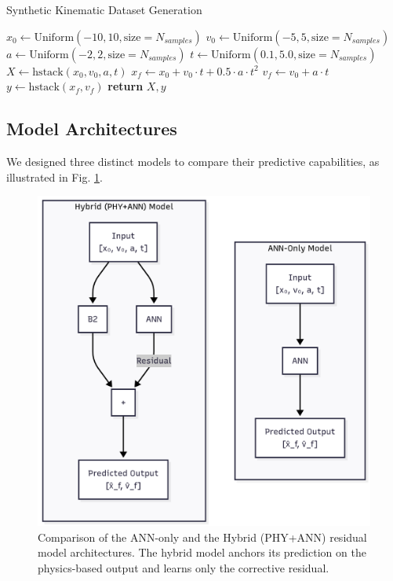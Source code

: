 \documentclass[conference]{IEEEtran}
\begin{document}
\begin{algorithm}
\caption{Synthetic Kinematic Dataset Generation}\label{alg:dataset}
\begin{algorithmic}[1]
    \State $x_0 \gets \text{Uniform}(-10, 10, \text{size}=N_{samples})$
    \State $v_0 \gets \text{Uniform}(-5, 5, \text{size}=N_{samples})$
    \State $a \gets \text{Uniform}(-2, 2, \text{size}=N_{samples})$
    \State $t \gets \text{Uniform}(0.1, 5.0, \text{size}=N_{samples})$
    \State $X \gets \text{hstack}(x_0, v_0, a, t)$
    \State
    \State $x_f \gets x_0 + v_0 \cdot t + 0.5 \cdot a \cdot t^2$
    \State $v_f \gets v_0 + a \cdot t$
    \State $y \gets \text{hstack}(x_f, v_f)$
    \State \textbf{return} $X, y$
\EndProcedure
\end{algorithmic}
\end{algorithm}

\subsection{Model Architectures}
We designed three distinct models to compare their predictive capabilities, as illustrated in Fig. \ref{fig:models}.

\begin{figure}[htbp]
\centerline{\includegraphics[width=\columnwidth]{figure1.png}}
\caption{Comparison of the ANN-only and the Hybrid (PHY+ANN) residual model architectures. The hybrid model anchors its prediction on the physics-based output and learns only the corrective residual.}
\label{fig:models}
\end{figure}
\end{document}
